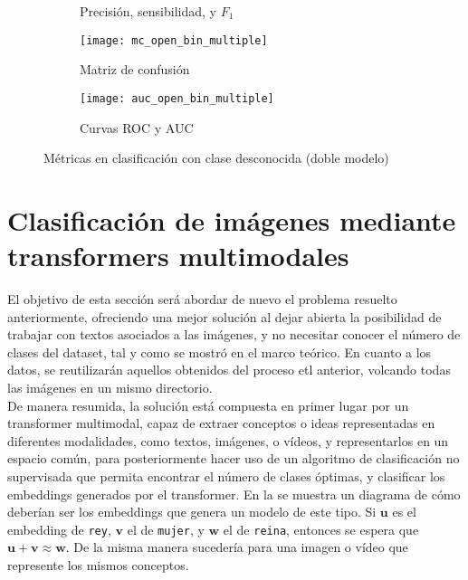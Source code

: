 				\begin{figure}[!h]
					\centering
					\begin{subfigure}{.5\textwidth}
						\centering
						
						\caption{Precisión, sensibilidad, y $F_1$}
						\label{fig:m_open_bin_multiple}
					\end{subfigure}
					\begin{subfigure}{.5\textwidth}
						\centering
						\texttt{[image: mc\_open\_bin\_multiple]}
						\caption{Matriz de confusión}
						\label{fig:mc_open_bin_multiple}
					\end{subfigure}\hfill
					\begin{subfigure}{.5\textwidth}
						\centering
						\texttt{[image: auc\_open\_bin\_multiple]}
						\caption{Curvas ROC y AUC}
						\label{fig:roc_open_bin_multiple}
					\end{subfigure}
					\caption{Métricas en clasificación con clase desconocida (doble modelo)}
					\label{fig:clase_otros_doble}
				\end{figure}
				
		\section{Clasificación de imágenes mediante transformers multimodales}
		
			El objetivo de esta sección será abordar de nuevo el problema resuelto anteriormente, ofreciendo una mejor solución al dejar abierta la posibilidad de trabajar con textos asociados a las imágenes, y no necesitar conocer el número de clases del dataset, tal y como se mostró en el marco teórico. En cuanto a los datos, se reutilizarán aquellos obtenidos del proceso \gls{etl} anterior, volcando todas las imágenes en un mismo directorio. \\
			
			De manera resumida, la solución está compuesta en primer lugar por un transformer multimodal, capaz de extraer conceptos o ideas representadas en diferentes modalidades, como textos, imágenes, o vídeos, y representarlos en un espacio común, para posteriormente hacer uso de un algoritmo de clasificación no supervisada que permita encontrar el número de clases óptimas, y clasificar los embeddings generados por el transformer. En la  se muestra un diagrama de cómo deberían ser los embeddings que genera un modelo de este tipo. Si $\textbf{u}$ es el embedding de \texttt{rey}, $\textbf{v}$ el de \texttt{mujer}, y $\textbf{w}$ el de \texttt{reina}, entonces se espera que $\textbf{u} + \textbf{v} \approx \textbf{w}$. De la misma manera sucedería para una imagen o vídeo que represente los mismos conceptos. \\
			
